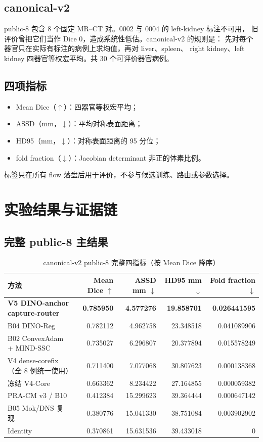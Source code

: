 \documentclass[11pt,a4paper]{ctexart}
\begin{document}
\subsection{canonical-v2}
public-8 包含 8 个固定 MR--CT 对。0002 与 0004 的 left-kidney 标注不可用，
旧评价曾把它们当作 Dice 0，造成系统性低估。canonical-v2 的规则是：
先对每个器官只在实际有标注的病例上求均值，再对 liver、spleen、
right kidney、left kidney 四器官等权宏平均。共 30 个可评价器官病例。

\subsection{四项指标}
\begin{itemize}
  \item Mean Dice（$\uparrow$）：四器官等权宏平均；
  \item ASSD（mm，$\downarrow$）：平均对称表面距离；
  \item HD95（mm，$\downarrow$）：对称表面距离的 95 分位；
  \item fold fraction（$\downarrow$）：Jacobian determinant 非正的体素比例。
\end{itemize}
标签只在所有 flow 落盘后用于评价，不参与候选训练、路由或参数选择。

\section{实验结果与证据链}

\subsection{完整 public-8 主结果}
\begin{table}[htbp]
\centering
\small
\caption{canonical-v2 public-8 完整四指标（按 Mean Dice 降序）}
\label{tab:main-results}
\begin{tabular}{p{4.4cm}rrrr}
\toprule
方法 & Mean Dice $\uparrow$ & ASSD mm $\downarrow$ & HD95 mm $\downarrow$ &
Fold fraction $\downarrow$\\
\midrule
\textbf{V5 DINO-anchor capture-router} &
\textbf{0.785950} & \textbf{4.577276} & \textbf{19.858701} & \textbf{0.026441595}\\
B04 DINO-Reg & 0.782112 & 4.962758 & 23.348518 & 0.041089906\\
B02 ConvexAdam + MIND-SSC & 0.735027 & 6.296807 & 20.377894 & 0.015578249\\
V4 dense-corefix（全 8 例统一使用） & 0.711400 & 7.077068 & 30.807623 & 0.000138368\\
冻结 V4-Core & 0.663362 & 8.234422 & 27.164855 & 0.000059382\\
PRA-CM v3 / B10 & 0.412384 & 15.299623 & 39.364444 & 0.000647142\\
B05 Mok/DNS 复现 & 0.380776 & 15.041330 & 38.751084 & 0.003902902\\
Identity & 0.370861 & 15.631536 & 39.433018 & 0\\
\bottomrule
\end{tabular}
\end{table}
\end{document}
